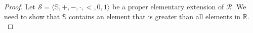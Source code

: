 \documentclass{article}
\begin{document}
\begin{enumerate}[label={\bf Q\arabic*:}]
\begin{proof}
      Let $\mathcal{S}=\langle\mathbb{S},+,-,\cdot,<,0,1\rangle$ be a
      proper elementary extension of $\mathcal{R}$. We need to show that
      $\mathbb{S}$ contains an element that is greater than all elements in
      $\mathbb{R}$. \\






\end{proof}
\end{enumerate}
\end{document}

